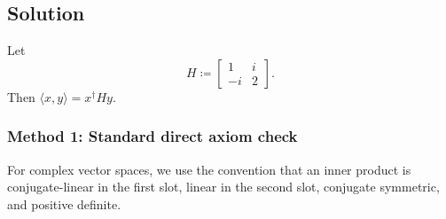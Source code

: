 \documentclass[12pt]{article}
\newcommand{\df}{\coloneqq}
\begin{document}
\vspace{1cm}
\subsection{Solution}
Let
\[
H\df
\begin{bmatrix}
1 & i\\
-i & 2
\end{bmatrix}.
\]
Then $\langle x,y\rangle=x^\dagger H y$.

\subsubsection{Method 1: Standard direct axiom check}
For complex vector spaces, we use the convention that an inner product is conjugate-linear in the first slot, linear in the second slot, conjugate symmetric, and positive definite.
\end{document}
